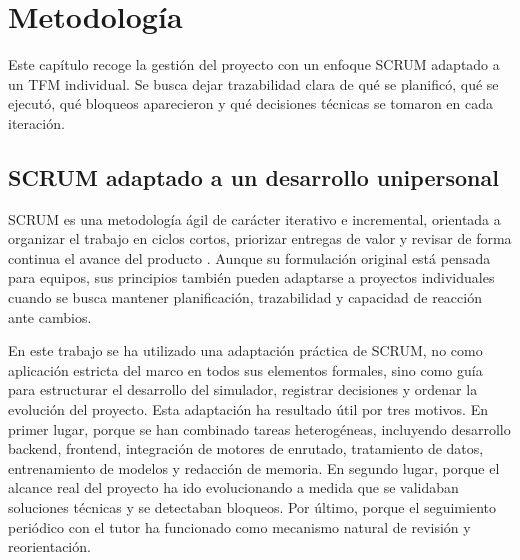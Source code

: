 \chapter{Metodología}
\label{ch:metodologia}

Este capítulo recoge la gestión del proyecto con un enfoque SCRUM adaptado a un TFM individual. Se busca dejar trazabilidad clara de qué se planificó, qué se ejecutó, qué bloqueos aparecieron y qué decisiones técnicas se tomaron en cada iteración.


\section{SCRUM adaptado a un desarrollo unipersonal}

SCRUM es una metodología ágil de carácter iterativo e incremental, orientada a organizar el trabajo en ciclos cortos, priorizar entregas de valor y revisar de forma continua el avance del producto \cite{ScrumGuide2020}. Aunque su formulación original está pensada para equipos, sus principios también pueden adaptarse a proyectos individuales cuando se busca mantener planificación, trazabilidad y capacidad de reacción ante cambios.\newline

En este trabajo se ha utilizado una adaptación práctica de SCRUM, no como aplicación estricta del marco en todos sus elementos formales, sino como guía para estructurar el desarrollo del simulador, registrar decisiones y ordenar la evolución del proyecto. Esta adaptación ha resultado útil por tres motivos. En primer lugar, porque se han combinado tareas heterogéneas, incluyendo desarrollo backend, frontend, integración de motores de enrutado, tratamiento de datos, entrenamiento de modelos y redacción de memoria. En segundo lugar, porque el alcance real del proyecto ha ido evolucionando a medida que se validaban soluciones técnicas y se detectaban bloqueos. Por último, porque el seguimiento periódico con el tutor ha funcionado como mecanismo natural de revisión y reorientación.

